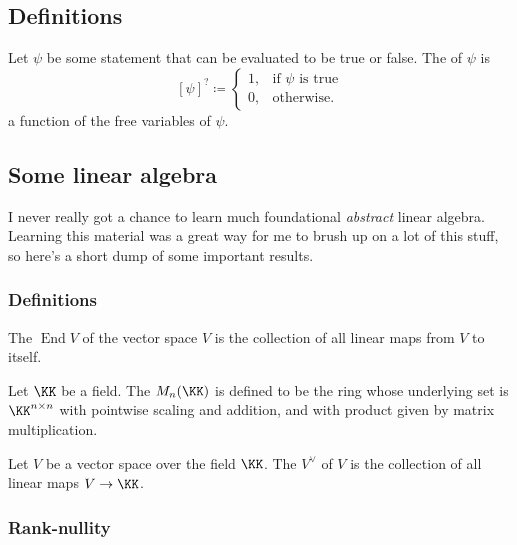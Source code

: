 \documentclass{article}
\DeclareMathOperator{\End}{End}
\begin{document}
\subsection{Definitions}

\begin{definition}
    Let $\psi$ be some statement that can be evaluated to be true or false.
    The  of $\psi$ is
    \[
        [\psi]^? \coloneq \begin{cases}
            1, & \text{if }\psi\text{ is true} \\
            0, & \text{otherwise}.
        \end{cases}
    \]
    a function of the free variables of $\psi$.
\end{definition}

\subsection{Some linear algebra}

I never really got a chance to learn much foundational \textit{abstract} linear algebra.
Learning this material was a great way for me to brush up on a lot of this stuff, so here's a short dump of some important results.

\subsubsection{Definitions}

\begin{definition}
    The  $\End V$ of the vector space $V$ is the collection of all linear maps from $V$ to itself.
\end{definition}

\begin{definition}
    Let $\KK$ be a field.
    The  $M_n(\KK)$ is defined to be the ring whose underlying set is $\KK^{n \times n}$ with pointwise scaling and addition, and with product given by matrix multiplication.
\end{definition}

\begin{definition}
    Let $V$ be a vector space over the field $\KK$.
    The  $V^\vee$ of $V$ is the collection of all linear maps $V \to \KK$.
\end{definition}

\subsubsection{Rank-nullity}
\end{document}
